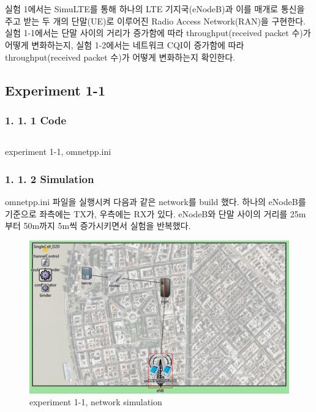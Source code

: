 \vspace{-6mm}
\section{}
실험 1에서는 SimuLTE를 통해 하나의 LTE 기지국(eNodeB)과 이를 매개로 통신을 주고 받는 두 개의 단말(UE)로 이루어진 Radio Access Network(RAN)을 구현한다. 실험 1-1에서는 단말 사이의 거리가 증가함에 따라 throughput(received packet 수)가 어떻게 변화하는지, 실험 1-2에서는 네트워크 CQI이 증가함에 따라 throughput(received packet 수)가 어떻게 변화하는지 확인한다.
\subsection*{Experiment 1-1}
    \subsubsection*{1. 1. 1 Code}
    \vspace{-3mm}
            \vspace{-2mm}
            \begin{listing}[h!]
            \inputminted[framerule = 1pt,framesep = 2mm , frame = lines, fontsize=\footnotesize]{c}{./code/week11/Experiment_01/omnet1.cpp}
            \vspace{-3mm}
            \caption{\footnotesize experiment 1-1, omnetpp.ini}
            \end{listing}
            \vspace{-6mm}
    \subsubsection*{1. 1. 2 Simulation}
    \vspace{-3mm}
        omnetpp.ini 파일을 실행시켜 다음과 같은 network를 build 했다. 하나의 eNodeB를 기준으로 좌측에는 TX가, 우측에는 RX가 있다. eNodeB와 단말 사이의 거리를 25m부터 50m까지 5m씩 증가시키면서 실험을 반복했다.
        \begin{figure}[!h]\centering 
	        \includegraphics[width=.68\textwidth]{image/week11/1-1-0.png}
	        \caption{\footnotesize
	        experiment 1-1, network simulation}
	        \vspace{-10pt}
        \end{figure}
        
